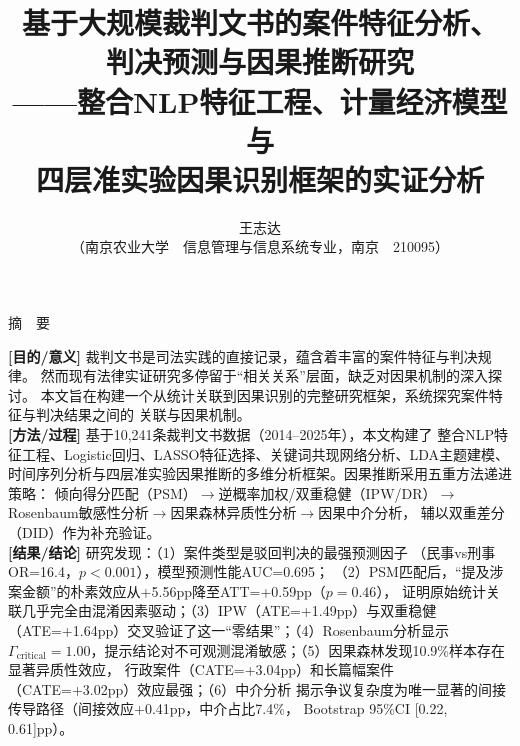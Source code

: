 \documentclass[12pt,a4paper,twoside]{ctexart}
\begin{document}
\title{
    \vspace{1.5cm}
    {\heiti\fontsize{18pt}{24pt}\selectfont 基于大规模裁判文书的案件特征分析、\\[8pt]
     判决预测与因果推断研究}\\[16pt]
    {\kaishu\fontsize{14pt}{20pt}\selectfont ——整合NLP特征工程、计量经济模型与\\四层准实验因果识别框架的实证分析}
    \vspace{1cm}
}

\author{
    {\fontsize{12pt}{16pt}\selectfont 王志达}\\[6pt]
    {\fontsize{10pt}{14pt}\selectfont （南京农业大学\ \ 信息管理与信息系统专业，南京\ \ 210095）}
}

\date{}
\maketitle
\thispagestyle{empty}

\begin{center}
{\heiti\fontsize{14pt}{18pt}\selectfont 摘\ \ 要}
\end{center}

\noindent
{\bfseries [目的/意义]} 裁判文书是司法实践的直接记录，蕴含着丰富的案件特征与判决规律。
然而现有法律实证研究多停留于``相关关系''层面，缺乏对因果机制的深入探讨。
本文旨在构建一个从统计关联到因果识别的完整研究框架，系统探究案件特征与判决结果之间的
关联与因果机制。\\[4pt]

\noindent
{\bfseries [方法/过程]} 基于10,241条裁判文书数据（2014--2025年），本文构建了
整合NLP特征工程、Logistic回归、LASSO特征选择、关键词共现网络分析、LDA主题建模、
时间序列分析与四层准实验因果推断的多维分析框架。因果推断采用五重方法递进策略：
倾向得分匹配（PSM）$\rightarrow$逆概率加权/双重稳健（IPW/DR）$\rightarrow$
Rosenbaum敏感性分析$\rightarrow$因果森林异质性分析$\rightarrow$因果中介分析，
辅以双重差分（DID）作为补充验证。\\[4pt]

\noindent
{\bfseries [结果/结论]} 研究发现：（1）案件类型是驳回判决的最强预测因子
（民事vs刑事OR=16.4，$p<0.001$），模型预测性能AUC=0.695；
（2）PSM匹配后，``提及涉案金额''的朴素效应从+5.56pp降至ATT=+0.59pp（$p=0.46$），
证明原始统计关联几乎完全由混淆因素驱动；（3）IPW（ATE=+1.49pp）与双重稳健
（ATE=+1.64pp）交叉验证了这一``零结果''；（4）Rosenbaum分析显示$\Gamma_{\text{critical}}
=1.00$，提示结论对不可观测混淆敏感；（5）因果森林发现10.9\%样本存在显著异质性效应，
行政案件（CATE=+3.04pp）和长篇幅案件（CATE=+3.02pp）效应最强；（6）中介分析
揭示争议复杂度为唯一显著的间接传导路径（间接效应+0.41pp，中介占比7.4\%，
Bootstrap 95\%CI [0.22, 0.61]pp）。\\[4pt]
\end{document}
